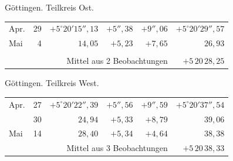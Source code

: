 \noindent\begin{minipage}[t]{.495\textwidth}\centering Göttingen. Teilkreis Ost.\par\smallskip
{\scriptsize\setlength{\tabcolsep}{1pt}\renewcommand{\arraystretch}{1.2}\begin{tabular}{lr|r|r|r|r|}
Apr.&29&$+5^\circ20'15''{,}13$&$+5''{,}38$&$+9''{,}06$&$+5^\circ20'29''{,}57$\\
Mai&4&$14{,}05$&$+5{,}23$&$+7{,}65$&$26{,}93$\\
&&&&&\\
\cline{6-6}\multicolumn{5}{r}{Mittel aus 2 Beobachtungen}&$+5\,20\,28{,}25$
\end{tabular}}\end{minipage}\hfill\begin{minipage}[t]{.495\textwidth}\centering Göttingen. Teilkreis West.\par\smallskip
{\scriptsize\setlength{\tabcolsep}{1pt}\renewcommand{\arraystretch}{1.2}\begin{tabular}{lr|r|r|r|r}
Apr.&27&$+5^\circ20'22''{,}39$&$+5''{,}56$&$+9''{,}59$&$+5^\circ20'37''{,}54$\\
&30&$24{,}94$&$+5{,}33$&$+8{,}79$&$39{,}06$\\
Mai&14&$28{,}40$&$+5{,}34$&$+4{,}64$&$38{,}38$\\
\cline{6-6}\multicolumn{5}{r}{Mittel aus 3 Beobachtungen}&$+5\,20\,38{,}33$
\end{tabular}}\end{minipage}
\par\vspace{4mm}

